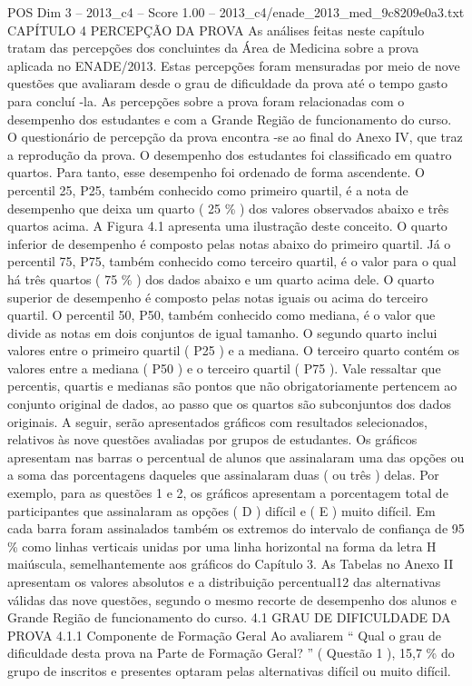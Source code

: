 \begin{textsample}{POS Dim 3 – 2013\_c4 – Score 1.00 – 2013\_c4/enade\_2013\_med\_9c8209e0a3.txt}  \label{ex:f3_pos_168}
CAPÍTULO 4 PERCEPÇÃO DA PROVA As análises feitas neste capítulo tratam das percepções dos concluintes da Área de Medicina sobre a prova aplicada no ENADE/2013.
Estas percepções foram mensuradas por meio de nove questões que avaliaram desde o grau de dificuldade da prova até o tempo gasto para concluí -la.
As percepções sobre a prova foram relacionadas com o desempenho dos estudantes e com a Grande Região de funcionamento do curso.
O questionário de percepção da prova encontra -se ao final do Anexo IV, que traz a reprodução da prova.
O desempenho dos estudantes foi classificado em quatro quartos.
Para tanto, esse desempenho foi ordenado de forma ascendente.
O percentil 25, P25, também conhecido como primeiro quartil, é a nota de desempenho que deixa um quarto ( 25 \% ) dos valores observados abaixo e três quartos acima.
A Figura 4.1 apresenta uma ilustração deste conceito.
O quarto inferior de desempenho é composto pelas notas abaixo do primeiro quartil.
Já o percentil 75, P75, também conhecido como terceiro quartil, é o valor para o qual há três quartos ( 75 \% ) dos dados abaixo e um quarto acima dele.
O quarto superior de desempenho é composto pelas notas iguais ou acima do terceiro quartil.
O percentil 50, P50, também conhecido como mediana, é o valor que divide as notas em dois conjuntos de igual tamanho.
O segundo quarto inclui valores entre o primeiro quartil ( P25 ) e a mediana.
O terceiro quarto contém os valores entre a mediana ( P50 ) e o terceiro quartil ( P75 ).
Vale ressaltar que percentis, quartis e medianas são pontos que não obrigatoriamente pertencem ao conjunto original de dados, ao passo que os quartos são subconjuntos dos dados originais.
A seguir, serão apresentados gráficos com resultados selecionados, relativos às nove questões avaliadas por grupos de estudantes.
Os gráficos apresentam nas barras o percentual de alunos que assinalaram uma das opções ou a soma das porcentagens daqueles que assinalaram duas ( ou três ) delas.
Por exemplo, para as questões 1 e 2, os gráficos apresentam a porcentagem total de participantes que assinalaram as opções ( D ) difícil e ( E ) muito difícil.
Em cada barra foram assinalados também os extremos do intervalo de confiança de 95 \% como linhas verticais unidas por uma linha horizontal na forma da letra H maiúscula, semelhantemente aos gráficos do Capítulo 3.
As Tabelas no Anexo II apresentam os valores absolutos e a distribuição percentual12 das alternativas válidas das nove questões, segundo o mesmo recorte de desempenho dos alunos e Grande Região de funcionamento do curso. 4.1 GRAU DE DIFICULDADE DA PROVA 4.1.1 Componente de Formação Geral Ao avaliarem “ Qual o grau de dificuldade desta prova na Parte de Formação Geral? ” ( Questão 1 ), 15,7 \% do grupo de inscritos e presentes optaram pelas alternativas difícil ou muito difícil.

\end{textsample}
